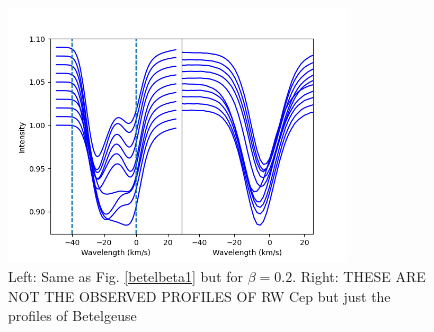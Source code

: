 \documentclass{/Users/art2/TeX/aanda/aa}
\def\kms {km\,s$^{-1}$}
\begin{document}
\begin{figure}
   \includegraphics[width=0.8\textwidth]{Fig1_Nadira2.png}
   \caption{Left: Same as Fig. \ref{betelbeta1} but for $\beta=0.2$. Right: THESE ARE NOT THE OBSERVED PROFILES OF RW Cep but just the profiles of Betelgeuse}
   \label{RWbeta}
   \end{figure}

\end{document}

